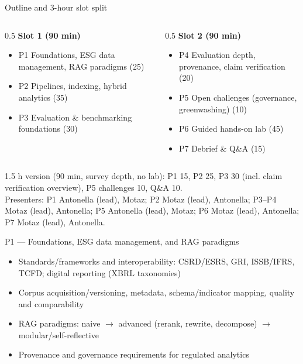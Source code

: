 \documentclass[aspectratio=169]{beamer}
\begin{document}
\begin{frame}{Outline and 3-hour slot split}
  \small
  \begin{columns}[T]
    \begin{column}{0.5\textwidth}
      \textbf{Slot 1 (90 min)}
      \begin{itemize}
        \item P1 Foundations, ESG data management, RAG paradigms (25)
        \item P2 Pipelines, indexing, hybrid analytics (35)
        \item P3 Evaluation \& benchmarking foundations (30)
      \end{itemize}
    \end{column}
    \begin{column}{0.5\textwidth}
      \textbf{Slot 2 (90 min)}
      \begin{itemize}
        \item P4 Evaluation depth, provenance, claim verification (20)
        \item P5 Open challenges (governance, greenwashing) (10)
        \item P6 Guided hands-on lab (45)
        \item P7 Debrief \& Q\&A (15)
      \end{itemize}
    \end{column}
  \end{columns}
  \vspace{0.4em}
  \footnotesize 1.5 h version (90 min, survey depth, no lab): P1 15, P2 25, P3 30 (incl. claim verification overview), P5 challenges 10, Q\&A 10.\\
  Presenters: P1 Antonella (lead), Motaz; P2 Motaz (lead), Antonella; P3--P4 Motaz (lead), Antonella; P5 Antonella (lead), Motaz; P6 Motaz (lead), Antonella; P7 Motaz (lead), Antonella.
\end{frame}

\begin{frame}{P1 --- Foundations, ESG data management, and RAG paradigms}
  \begin{itemize}
    \item Standards/frameworks and interoperability: CSRD/ESRS, GRI, ISSB/IFRS, TCFD; digital reporting (XBRL taxonomies)
    \item Corpus acquisition/versioning, metadata, schema/indicator mapping, quality and comparability
    \item RAG paradigms: naive $\rightarrow$ advanced (rerank, rewrite, decompose) $\rightarrow$ modular/self-reflective
    \item Provenance and governance requirements for regulated analytics
  \end{itemize}
\end{frame}
\end{document}
